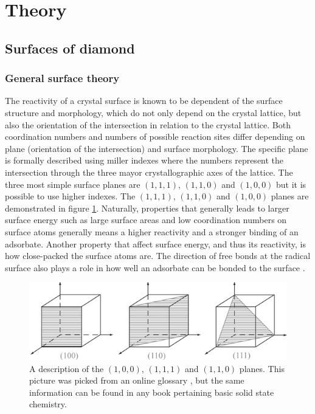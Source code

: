 \documentclass[10pt,a4paper]{article}
\begin{document}
\section{Theory}
\subsection{Surfaces of diamond}
\subsubsection{General surface theory}
The reactivity of a crystal surface is known to be dependent of the surface structure and morphology, which do not only depend on the crystal lattice, but also the orientation of the intersection in relation to the crystal lattice. Both coordination numbers and numbers of possible reaction sites differ depending on plane (orientation of the intersection) and surface morphology. The specific plane is formally described using miller indexes where the numbers represent the intersection through the three mayor crystallographic axes of the lattice. The three most simple surface planes are $(1,  1, 1)$, $(1,  1,  0)$ and $(1,  0,  0)$ but it is possible to use higher indexes. The $(1,  1, 1)$, $(1,  1,  0)$ and $(1,  0,  0)$ planes are demonstrated in figure \ref{millerindex}. Naturally, properties that generally leads to larger surface energy such as large surface areas and low coordination numbers on surface atoms generally means a higher reactivity and a stronger binding of an adsorbate. Another property that affect surface energy, and thus its reactivity, is how close-packed the surface atoms are. The direction of free bonds at the radical surface also plays a role in how well an adsorbate can be bonded to the surface \cites{surfaces, BAHC}. 

\begin{figure} \captionsetup{width=.8\linewidth}
\caption{A description of the  $(1,  0,  0)$, $(1,  1, 1)$ and $(1,  1,  0)$ planes. This picture was picked from an online glossary \cite{millerindex}, but the same information can be found in any book pertaining basic solid state chemistry.} \label{millerindex}
%
\includegraphics[width=.8\linewidth]{pictures/millerindex.png}
\end{figure}
\end{document}
